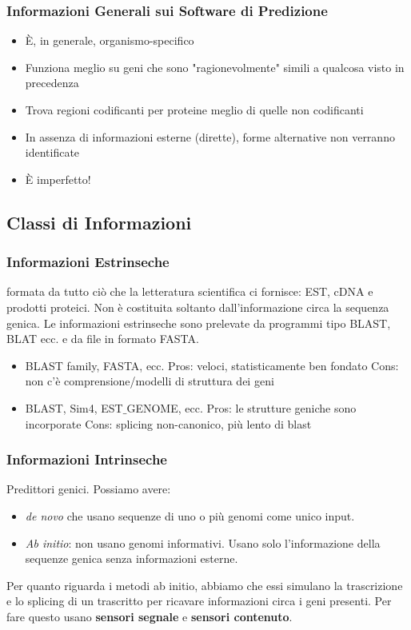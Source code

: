 \documentclass{article}
\begin{document}
\subsubsection{Informazioni Generali sui Software di Predizione}
\begin{itemize}
    \item È, in generale, organismo-specifico
    \item Funziona meglio su geni che sono "ragionevolmente" simili a qualcosa visto in precedenza
    \item Trova regioni codificanti per proteine meglio di quelle non codificanti
    \item In assenza di informazioni esterne (dirette), forme alternative non verranno identificate
    \item È imperfetto!
\end{itemize}
\subsection{Classi di Informazioni}
\subsubsection{Informazioni Estrinseche}
formata da tutto ciò che la letteratura scientifica ci fornisce: EST, cDNA e prodotti proteici. Non è costituita soltanto dall'informazione circa la sequenza genica. Le informazioni estrinseche sono prelevate da programmi tipo BLAST, BLAT ecc. e da file in formato FASTA.
\begin{itemize}
    \item BLAST family, FASTA, ecc.
        \subitem Pros: veloci, statisticamente ben fondato
        \subitem Cons: non c'è comprensione/modelli di struttura dei geni 
    \item BLAST, Sim4, EST$\_$GENOME, ecc.
        \subitem Pros: le strutture geniche sono incorporate
        \subitem Cons: splicing non-canonico, più lento di blast 
\end{itemize}
\subsubsection{Informazioni Intrinseche}
Predittori genici. Possiamo avere:
\begin{itemize}
    \item \textit{de novo} che usano sequenze di uno o più genomi come unico input.
    \item \textit{Ab initio}: non usano genomi informativi. Usano solo l'informazione della sequenze genica senza informazioni esterne.
\end{itemize}
Per quanto riguarda i metodi ab initio, abbiamo che essi simulano la trascrizione e lo splicing di un trascritto per ricavare informazioni circa i geni presenti. Per fare questo usano \textbf{sensori segnale} e \textbf{sensori contenuto}.
\end{document}

